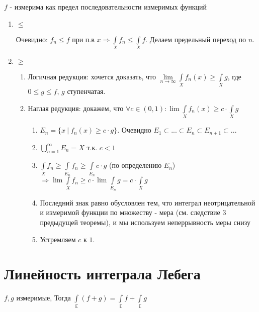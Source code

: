 \documentclass[paper=a4, fontsize=14pt]{report}
\begin{document}
$f$ - измерима как предел последовательности измеримых функций

\begin{enumerate}
	\item $\leqslant$

	Очевидно: $f_n \leqslant f$ при п.в $x \Rightarrow \int\limits_{X}f_n \leqslant \int\limits_{X}f$. Делаем предельный переход по $n$.

	\item $\geqslant$
		\begin{enumerate}
			\item Логичная редукция: хочется доказать, что $\lim\limits_{n \rightarrow \infty} \int\limits_{X}f_n(x) \geqslant \int\limits_{X}g$, где $0 \leqslant g \leqslant f$, $g$ ступенчатая.

			\item Наглая редукция: докажем, что $\forall c \in (0,1): \lim\int\limits_{X}f_n(x) \geqslant c \cdot \int\limits_{X}g$
				\begin{enumerate}
					\item $E_n = \{x\ |\ f_n(x) \geqslant c \cdot g\}$. Очевидно $E_1 \subset ... \subset E_n \subset E_{n + 1} \subset ...$

					\item $\bigcup\limits_{n=1}^{\infty}E_n = X$ т.к. $c < 1$

					\item $\int\limits_{X}f_n \geqslant \int\limits_{E_n}f_n \geqslant \int\limits_{E_n}c \cdot g$ (по определению $E_n$)\\
                    $\Rightarrow \lim \int\limits_{X}f_n \geqslant c \cdot \lim \int\limits_{E_n}g = c \cdot \int\limits_{X}g$

					\item Последний знак равно обусловлен тем, что интеграл неотрицательной и измеримой функции по множеству - мера (см. следствие 3 предыдущей теоремы), и мы используем неперрывность меры снизу

                    \item Устремляем $c$ к $1$.
				\end{enumerate}
		\end{enumerate}
\end{enumerate}

\section{Линейность интеграла Лебега}
$f, g $ измеримые, 
Тогда $\int\limits_{\mathds{E}} (f + g) = \int\limits_{\mathds{E}} f + \int\limits_{\mathds{E}} g$
\end{document}
